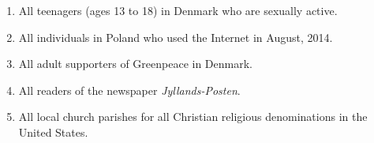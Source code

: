 \documentclass[a4, 12pt]{article}
\begin{document}
\begin{enumerate}
\item All teenagers (ages 13 to 18) in Denmark who are sexually active.

\item All individuals in Poland who used the Internet in August, 2014.

\item All adult supporters of Greenpeace in Denmark.

\item All readers of the newspaper \textit{Jyllands-Posten}.

\item All local church parishes for all Christian religious denominations in the United States.

\end{enumerate}
\end{document}
